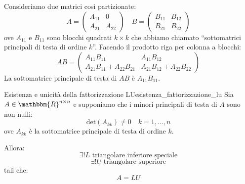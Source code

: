 \documentclass[12pt]{report}
\newcounter{theorem}
\newcommand{\nmu}{}
\begin{document}
Consideriamo due matrici così partizionate:
\[
A = \begin{pmatrix}
	A_{11} & 0 \\
	A_{21} & A_{22}
\end{pmatrix} \quad B = \begin{pmatrix}
	B_{11} & B_{12} \\
	B_{21} & B_{22}
\end{pmatrix}
\]
ove $A_{11}$ e $B_{11}$ sono blocchi quadrati $k \times k$ che abbiamo chiamato ``sottomatrici principali di testa di ordine $k$''. Facendo il prodotto riga per colonna a blocchi:
\[
AB = \begin{pmatrix}
	A_{11}B_{11} & A_{11}B_{12} \\
	A_{21}B_{11} + A_{22}B_{21} & A_{21}B_{12} + A_{22}B_{22}
\end{pmatrix}
\]
La sottomatrice principale di testa di $AB$ è $A_{11}B_{11}$.
\begin{theorem}{\nmu Esistenza e unicità della fattorizzazione LU}{esistenza_fattorizzazione_lu}
	Sia $A \in \mathbbm{R}^{n \times n}$ e supponiamo che i minori principali di testa di $A$ sono non nulli:
	\[
	\text{det}(A_{kk}) \neq 0 \quad k = 1, \dots, n
	\]
	ove $A_{kk}$ è la sottomatrice principale di testa di ordine $k$.

	Allora:
	\[
	\exists ! L \text{ triangolare inferiore speciale}
	\]
	\[
	\exists ! U \text{ triangolare superiore}
	\]
	tali che:
	\[
	A = LU
	\]
\end{theorem}
\end{document}
